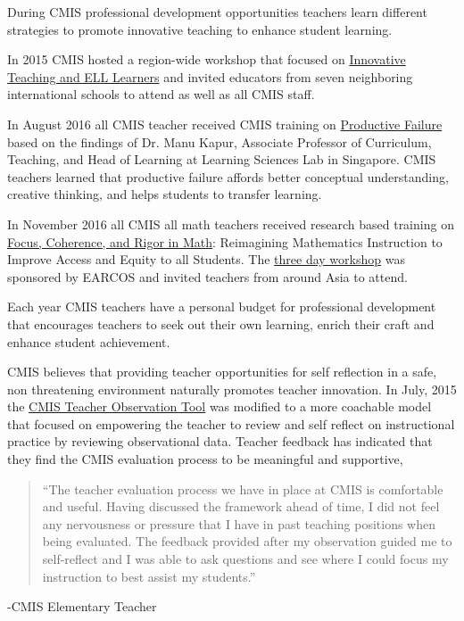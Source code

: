 \begin{findings}
During CMIS professional development opportunities teachers learn different strategies to promote innovative teaching to enhance student learning.


In 2015 CMIS hosted a region-wide workshop that focused on \href{https://docs.google.com/forms/d/e/1FAIpQLSdK2QvcDZyM_yfhT22BgModehhwhn3I8Ps6VoW2EIzaK-qing/viewform?c=0&w=1}{ Innovative Teaching and  ELL Learners} and invited educators from seven neighboring international schools to attend as well as all CMIS staff. 

In August 2016 all CMIS teacher received CMIS training on \href{https://docs.google.com/a/cmis.ac.th/presentation/d/1S1x1yEj7KDD6jM7u1RdTZJEt10_0r6mcJ-LmRb6iPWs/edit?usp=sharing}{Productive Failure}  based on the findings of Dr. Manu Kapur, Associate Professor of Curriculum, Teaching, and Head of Learning at Learning Sciences Lab in Singapore. CMIS teachers learned that productive failure affords better conceptual understanding, creative thinking, and helps students to transfer learning.

In November 2016 all CMIS all math teachers received research based training on \href{https://drive.google.com/a/cmis.ac.th/file/d/0ByVFfrm0zfolSXFEZFJVN1VOaTQ/view?usp=sharing}{Focus, Coherence, and Rigor in Math}: Reimagining Mathematics Instruction to Improve Access and Equity to all Students. The \href{https://docs.google.com/document/d/14wHOzYz9lk79YGv4aYLtMEkqAN0Z6vBBI3POYZPeIC4/edit?usp=sharing}{three day workshop} was sponsored by EARCOS and invited teachers from around Asia to attend. 

Each year CMIS teachers have a personal budget for professional development that encourages teachers to seek out their own learning, enrich their craft and enhance student achievement.

CMIS believes that providing teacher opportunities for self reflection in a safe, non threatening environment naturally promotes teacher innovation. In July, 2015 the \href{https://docs.google.com/document/d/15_5X5QtixmWVheEUBVO9N1aislsLDm_ZW4-4g4YQ7F4/edit?usp=sharing}{CMIS Teacher Observation Tool} was modified to a more coachable model that  focused on empowering the teacher to review and self reflect on instructional practice by reviewing observational data. Teacher feedback has indicated that they find the CMIS evaluation process to be meaningful and supportive,

\blockquote{``The teacher evaluation process we have in place at CMIS is comfortable and useful. Having discussed the framework ahead of time, I did not feel any nervousness or pressure that I have in past teaching positions when being evaluated. The feedback provided after my observation guided me to self-reflect and I was able to ask questions and see where I could focus my instruction to best assist my students.''} -CMIS Elementary Teacher


\end{findings}

